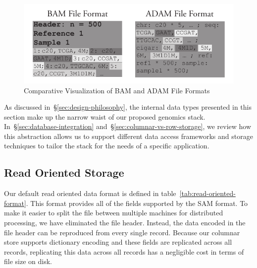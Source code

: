 \documentclass[10pt,twocolumn]{article}
\begin{document}
\begin{figure}[h]
\begin{center}
\includegraphics[width=\linewidth]{file-format.pdf}
\end{center}
\caption{Comparative Visualization of BAM and ADAM File Formats}
\label{fig:file-format}
\end{figure}

As discussed in~\S\ref{sec:design-philosophy}, the internal data types presented in this section make up the narrow waist of our
proposed genomics stack. In~\S\ref{sec:database-integration} and~\S\ref{sec:columnar-vs-row-storage}, we review how this
abstraction allows us to support different data access frameworks and storage techniques to tailor the stack for the needs of
a specific application.

\subsection{Read Oriented Storage}
\label{sec:read-oriented-storage}

Our default read oriented data format is defined in table~\ref{tab:read-oriented-format}. This format provides all of the
fields supported by the SAM format. To make it easier to split the file between multiple machines for distributed processing,
we have eliminated the file header. Instead, the data encoded in the file header can be reproduced from every single
record. Because our columnar store supports dictionary encoding and these fields are replicated across all records,
replicating this data across all records has a negligible cost in terms of file size on disk.
\end{document}
